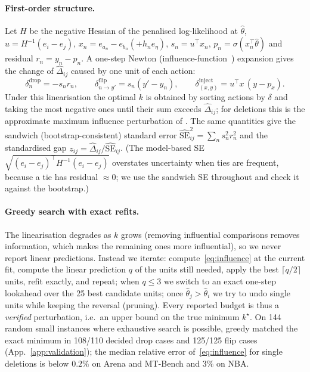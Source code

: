 \paragraph{First-order structure.}
Let $H$ be the negative Hessian of the penalised log-likelihood at $\hat\theta$, $u=H^{-1}(e_i-e_j)$, $x_n=e_{a_n}-e_{b_n}(+h_n e_\eta)$, $s_n=u^\top x_n$, $p_n=\sigma(x_n^\top\hat\theta)$ and residual $r_n=y_n-p_n$.
A one-step Newton (influence-function~\citep{hampel1974influence,cook1977detection,koh2017understanding}) expansion gives the change of $\hat\Delta_{ij}$ caused by one unit of each action:
\begin{equation}
\delta^{\text{drop}}_n=-s_n r_n,\qquad
\delta^{\text{flip}}_{n\to y'}=s_n(y'-y_n),\qquad
\delta^{\text{inject}}_{(x,y)}=u^\top x\,(y-p_x).
\label{eq:influence}
\end{equation}
Under this linearisation the optimal $k$ is obtained by sorting actions by $\delta$ and taking the most negative ones until their sum exceeds $\hat\Delta_{ij}$; for deletions this is the approximate maximum influence perturbation of \citet{broderick2020automatic}.
The same quantities give the sandwich (bootstrap-consistent) standard error $\widehat{\mathrm{SE}}^2_{ij}=\sum_n s_n^2r_n^2$ and the standardised gap $z_{ij}=\hat\Delta_{ij}/\widehat{\mathrm{SE}}_{ij}$.
(The model-based SE $\sqrt{(e_i-e_j)^\top H^{-1}(e_i-e_j)}$ overstates uncertainty when ties are frequent, because a tie has residual $\approx 0$; we use the sandwich SE throughout and check it against the bootstrap.)

\paragraph{Greedy search with exact refits.}
The linearisation degrades as $k$ grows (removing influential comparisons removes information, which makes the remaining ones more influential), so we never report linear predictions.
Instead we iterate: compute~\eqref{eq:influence} at the current fit, compute the linear prediction $q$ of the units still needed, apply the best $\lceil q/2\rceil$ units, refit exactly, and repeat; when $q\le 3$ we switch to an exact one-step lookahead over the 25 best candidate units; once $\hat\theta_j>\hat\theta_i$ we try to undo single units while keeping the reversal (pruning).
Every reported budget is thus a \emph{verified} perturbation, i.e.\ an upper bound on the true minimum $k^\star$.
On 144 random small instances where exhaustive search is possible, greedy matched the exact minimum in 108/110 decided drop cases and 125/125 flip cases (App.~\ref{app:validation}); the median relative error of~\eqref{eq:influence} for single deletions is below $0.2\%$ on Arena and MT-Bench and $3\%$ on NBA.

